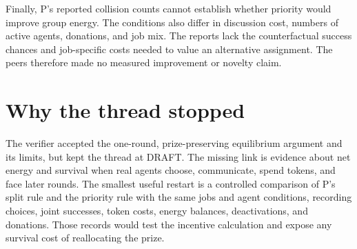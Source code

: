 \documentclass{article}
\begin{document}
Finally, P's reported collision counts cannot establish whether priority would improve group energy.
The conditions also differ in discussion cost, numbers of active agents, donations, and job mix. The
reports lack the counterfactual success chances and job-specific costs needed to value an
alternative assignment. The peers therefore made no measured improvement or novelty claim.

\section{Why the thread stopped}

The verifier accepted the one-round, prize-preserving equilibrium argument and its limits, but kept
the thread at DRAFT. The missing link is evidence about net energy and survival when real agents
choose, communicate, spend tokens, and face later rounds. The smallest useful restart is a
controlled comparison of P's split rule and the priority rule with the same jobs and agent
conditions, recording choices, joint successes, token costs, energy balances, deactivations, and
donations. Those records would test the incentive calculation and expose any survival cost of
reallocating the prize.



\end{document}
